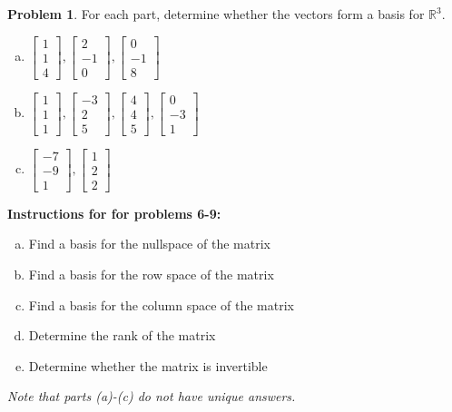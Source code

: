 \documentclass[10pt]{article}
\theoremstyle{definition}
\newtheorem{problem}[theorem]{Problem}
\newcommand{\1}[1]{\textbf{1}_{\left[#1\right]}} %
\def\R{\mathbb{R}} %
\begin{document}
\begin{problem}
  For each part, determine whether the vectors form a basis for $\R^{3}$.
  \begin{enumerate}[(a)]
    \item $
    \begin{bmatrix}
      1\\1\\4
    \end{bmatrix},
    \begin{bmatrix}
      2\\-1\\0
    \end{bmatrix},
    \begin{bmatrix}
      0\\-1\\8
    \end{bmatrix}
    $
    \item $
    \begin{bmatrix}
      1\\1\\1
    \end{bmatrix},
    \begin{bmatrix}
      -3\\2\\5
    \end{bmatrix},
    \begin{bmatrix}
      4\\4\\5
    \end{bmatrix},
    \begin{bmatrix}
      0\\-3\\1
    \end{bmatrix}
    $
    \item $
    \begin{bmatrix}
      -7\\-9\\1
    \end{bmatrix},
    \begin{bmatrix}
      1\\2\\2
    \end{bmatrix}
    $
  \end{enumerate}
\end{problem}
\noindent \textbf{Instructions for for problems 6-9:}
\begin{enumerate}[(a)]
  \item Find a basis for the nullspace of the matrix
  \item Find a basis for the row space of the matrix
  \item Find a basis for the column space of the matrix
  \item Determine the rank of the matrix
  \item Determine whether the matrix is invertible
\end{enumerate}
\textit{Note that parts (a)-(c) do not have unique answers.}
\end{document}
